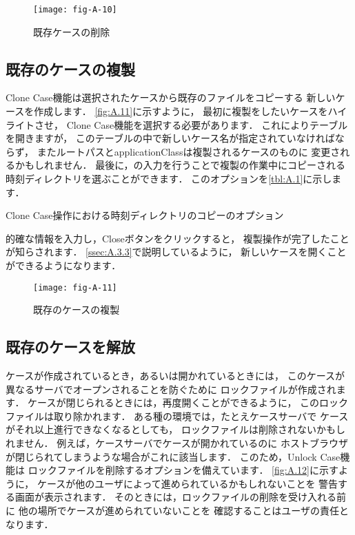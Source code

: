 \begin{figure}[ht]
 \texttt{[image: fig-A-10]}
 \caption{既存ケースの削除}
 \label{fig:A.10}
\end{figure}


\subsection{既存のケースの複製}
\label{ssec:A.3.5}
Clone Case機能は選択されたケースから既存のファイルをコピーする
新しいケースを作成します．
\autoref{fig:A.11}に示すように，
最初に複製をしたいケースをハイライトさせ，
Clone Case機能を選択する必要があります．
これによりテーブルを開きますが，
このテーブルの中で新しいケース名が指定されていなければならず，
またルートパスとapplicationClassは複製されるケースのものに
変更されるかもしれません．
最後に，の入力を行うことで複製の作業中にコピーされる
時刻ディレクトリを選ぶことができます．
このオプションを\autoref{tbl:A.1}に示します．


\begin{table}[ht]
 
 \caption{Clone Case操作における時刻ディレクトリのコピーのオプション}
 \label{tbl:A.1}
\end{table}


的確な情報を入力し，Closeボタンをクリックすると，
複製操作が完了したことが知らされます．
\autoref{ssec:A.3.3}で説明しているように，
新しいケースを開くことができるようになります．


\begin{figure}[ht]
 \texttt{[image: fig-A-11]}
 \caption{既存のケースの複製}
 \label{fig:A.11}
\end{figure}


\subsection{既存のケースを解放}
\label{ssec:A.3.6}
ケースが作成されているとき，あるいは開かれているときには，
このケースが異なるサーバでオープンされることを防ぐために
ロックファイルが作成されます．
ケースが閉じられるときには，再度開くことができるように，
このロックファイルは取り除かれます．
ある種の環境では，たとえケースサーバで
ケースがそれ以上進行できなくなるとしても，
ロックファイルは削除されないかもしれません．
例えば，ケースサーバでケースが開かれているのに
ホストブラウザが閉じられてしまうような場合がこれに該当します．
このため，Unlock Case機能は
ロックファイルを削除するオプションを備えています．
\autoref{fig:A.12}に示すように，
ケースが他のユーザによって進められているかもしれないことを
警告する画面が表示されます．
そのときには，ロックファイルの削除を受け入れる前に
他の場所でケースが進められていないことを
確認することはユーザの責任となります．


